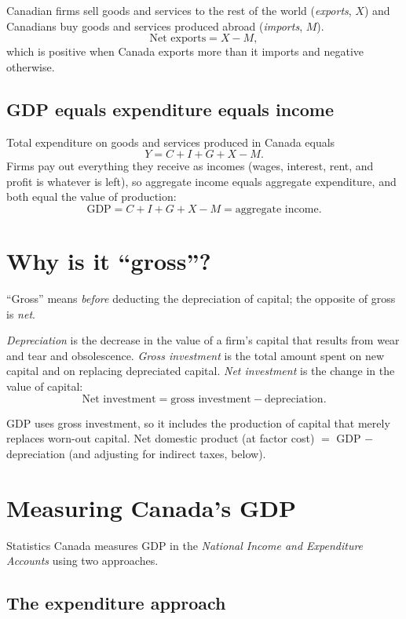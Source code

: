 Canadian firms sell goods and services to the rest of the world (\emph{exports}, $X$)
and Canadians buy goods and services produced abroad (\emph{imports}, $M$).
\[
  \text{Net exports} = X - M,
\]
which is positive when Canada exports more than it imports and negative otherwise.

\subsection{GDP equals expenditure equals income}

Total expenditure on goods and services produced in Canada equals
\[
  Y = C + I + G + X - M.
\]
Firms pay out everything they receive as incomes (wages, interest, rent, and profit is
whatever is left), so aggregate income equals aggregate expenditure, and both equal the
value of production:
\[
  \boxed{\text{GDP} = C + I + G + X - M = \text{aggregate income}.}
\]

\section{Why is it ``gross''?}

``Gross'' means \emph{before} deducting the depreciation of capital; the opposite of gross
is \emph{net}.

\begin{definition}
\emph{Depreciation} is the decrease in the value of a firm's capital that results from
wear and tear and obsolescence. \emph{Gross investment} is the total amount spent on new
capital and on replacing depreciated capital. \emph{Net investment} is the change in the
value of capital:
\[
  \text{Net investment} = \text{gross investment} - \text{depreciation}.
\]
\end{definition}

GDP uses gross investment, so it includes the production of capital that merely replaces
worn-out capital. Net domestic product (at factor cost) $=$ GDP $-$ depreciation (and
adjusting for indirect taxes, below).

\section{Measuring Canada's GDP}

Statistics Canada measures GDP in the \emph{National Income and Expenditure Accounts}
using two approaches.

\subsection{The expenditure approach}

